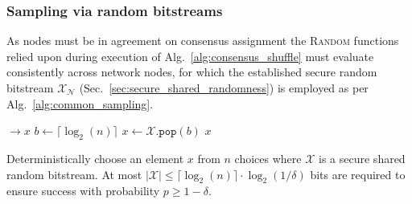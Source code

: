 \documentclass[twocolumn, aps, amsmath, amssymb, nofootinbib, superscriptaddress, longbibliography, floatfix, eqsecnum, rmp]{revtex4-2}
\let\oldalgorithmic\algorithmic
\let\endoldalgorithmic\endalgorithmic
\renewenvironment{algorithmic}
{\begin{adjustwidth}{-1em}{}\oldalgorithmic}
{\endoldalgorithmic\end{adjustwidth}}
\begin{document}
%
%

\subsubsection{Sampling via random bitstreams} \label{sec:random_bitstreams}

As nodes must be in agreement on consensus assignment the \textsc{Random} functions relied upon during execution of Alg.~\ref{alg:consensus_shuffle} must evaluate consistently across network nodes, for which the established secure random bitstream $\mathcal{X}_\mathcal{N}$ (Sec.~\ref{sec:secure_shared_randomness}) is employed as per Alg.~\ref{alg:common_sampling}.

\begin{algorithm}[H]
\begin{algorithmic}
 $\to x$
	\Repeat
	\State $b \gets \lceil \log_2(n) \rceil$ 
	\State $x \gets \mathcal{X}.\mathtt{pop}(b)$ 
	 
	\State \Return $x$
\EndFunction
\end{algorithmic}
\caption{Deterministically choose an element $x$ from $n$ choices where $\mathcal{X}$ is a secure shared random bitstream. At most \mbox{$|\mathcal{X}| \leq \lceil \log_2(n) \rceil \cdot \log_2(1/\delta)$} bits are required to ensure success with probability \mbox{$p\geq 1-\delta$}.} \label{alg:common_sampling}
\end{algorithm}
\end{document}
